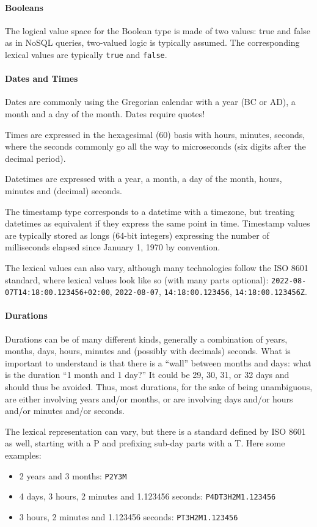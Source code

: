 \paragraph{Booleans}
The logical value space for the Boolean type is made of two values: true and false as in NoSQL queries, two-valued logic is typically assumed.
The corresponding lexical values are typically \texttt{true} and \texttt{false}.

\paragraph{Dates and Times}
Dates are commonly using the Gregorian calendar with a year (BC or AD), a month and a day of the month. Dates require quotes!

Times are expressed in the hexagesimal (60) basis with hours, minutes, seconds, where the seconds commonly go all the way to microseconds (six digits after the decimal period).

Datetimes are expressed with a year, a month, a day of the month, hours, minutes and (decimal) seconds.

The timestamp type corresponds to a datetime with a timezone, but treating datetimes as equivalent if they express the same point in time. Timestamp values are typically stored as longs (64-bit integers) expressing the number of milliseconds elapsed since January 1, 1970 by convention.

The lexical values can also vary, although many technologies follow the ISO 8601 standard, where lexical values look like so (with many parts optional): \texttt{2022-08-07T14:18:00.123456+02:00}, \texttt{2022-08-07}, \texttt{14:18:00.123456}, \texttt{14:18:00.123456Z}.

\paragraph{Durations}
Durations can be of many different kinds, generally a combination of years, months, days, hours, minutes and (possibly with decimals) seconds.
What is important to understand is that there is a “wall” between months and days: what is the duration “1 month and 1 day?” It could be 29, 30, 31, or 32 days and should thus be avoided. Thus, most durations, for the sake of being unambiguous, are either involving years and/or months, or are involving days and/or hours and/or minutes and/or seconds.

The lexical representation can vary, but there is a standard defined by ISO 8601 as well, starting with a P and prefixing sub-day parts with a T. Here some examples:
\begin{itemize}
    \item 2 years and 3 months: \texttt{P2Y3M}
    \item 4 days, 3 hours, 2 minutes and 1.123456 seconds: \texttt{P4DT3H2M1.123456}
    \item 3 hours, 2 minutes and 1.123456 seconds: \texttt{PT3H2M1.123456}
\end{itemize}

